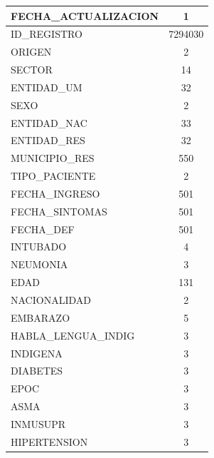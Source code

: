 \begin{table}[h]
\resizebox{7cm}{!} {
\begin{tabular}{|l|c|}
\hline
FECHA\_ACTUALIZACION    & 1                        \\ \hline
ID\_REGISTRO            & 7294030                  \\ \hline
ORIGEN                  & 2                        \\ \hline
SECTOR                  & 14                       \\ \hline
ENTIDAD\_UM             & 32                       \\ \hline
SEXO                    & 2                        \\ \hline
ENTIDAD\_NAC            & 33                       \\ \hline
ENTIDAD\_RES            & 32                       \\ \hline
MUNICIPIO\_RES          & 550                      \\ \hline
TIPO\_PACIENTE          & 2                        \\ \hline
FECHA\_INGRESO          & 501                      \\ \hline
FECHA\_SINTOMAS         & 501                      \\ \hline
FECHA\_DEF              & 501                      \\ \hline
INTUBADO                & 4                        \\ \hline
NEUMONIA                & 3                        \\ \hline
EDAD                    & 131                      \\ \hline
NACIONALIDAD            & 2                        \\ \hline
EMBARAZO                & 5                        \\ \hline
HABLA\_LENGUA\_INDIG    & 3                        \\ \hline
INDIGENA                & 3                        \\ \hline
DIABETES                & 3                        \\ \hline
EPOC                    & 3                        \\ \hline
ASMA                    & 3                        \\ \hline
INMUSUPR                & 3                        \\ \hline
HIPERTENSION            & 3                        \\ \hline

\end{tabular}}
\end{table}
